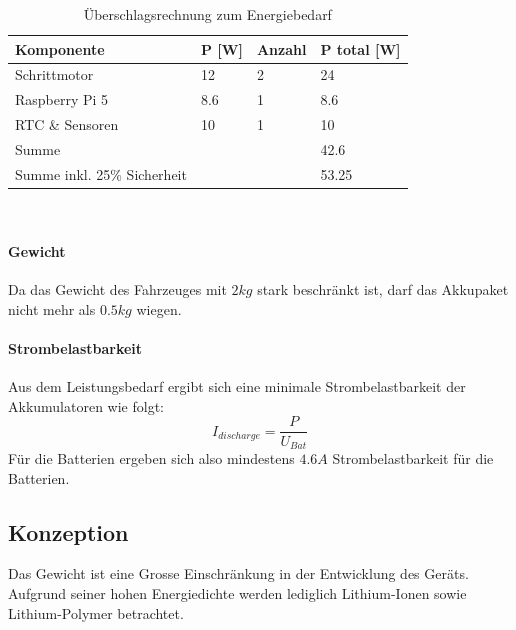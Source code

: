 \documentclass[main.tex]{subfiles} %
\begin{document}
\begin{table}[h!]
    \centering
    \begin{tabular}{|l|l|l|l|}
        \hline
        \textbf{Komponente}         & \textbf{P [W]} & \textbf{Anzahl} & \textbf{P total [W]} \\ \hline
        Schrittmotor                & 12             & 2               & 24                   \\ \hline
        Raspberry Pi 5              & 8.6            & 1               & 8.6                  \\ \hline
        RTC \& Sensoren             & 10             & 1               & 10                   \\ \hline
        Summe                       &                &                 & 42.6                 \\ \hline
        Summe inkl. 25\% Sicherheit &                &                 & 53.25                \\ \hline
    \end{tabular}
    \caption{Überschlagsrechnung zum Energiebedarf}~\label{tab:Energiebedarf_Akku}
\end{table}

\paragraph{Gewicht} Da das Gewicht des Fahrzeuges mit $2 kg$ stark beschränkt ist, darf das
Akkupaket nicht mehr als $ 0.5 kg$ wiegen.

\paragraph{Strombelastbarkeit}
Aus dem Leistungsbedarf ergibt sich eine minimale Strombelastbarkeit der
Akkumulatoren wie folgt:
\[
    I_{discharge} = \frac{P}{U_{Bat}}
\]
Für die Batterien ergeben sich also mindestens $4.6 A$ Strombelastbarkeit für
die Batterien.

\newpage
\subsection{Konzeption}

Das Gewicht ist eine Grosse Einschränkung in der Entwicklung des Geräts.
Aufgrund seiner hohen Energiedichte werden lediglich Lithium-Ionen sowie
Lithium-Polymer betrachtet.

\newpage
\end{document}
